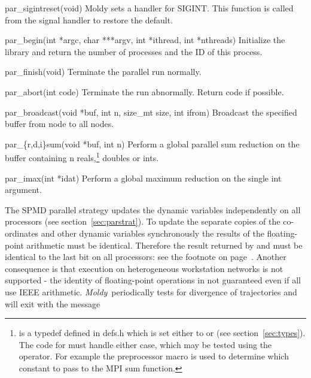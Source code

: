 \documentclass[a4paper,twoside]{report}
\newcommand{\Fname}[1]{{\upshape\mdseries\sffamily#1}}
\newenvironment{Litdescription}{\begingroup%
     \renewcommand{\descriptionlabel}[1]{\Lit{##1}}\begin{description}}%
     {\end{description}\endgroup}
\newcommand{\moldy}{\emph{Moldy}}
\begin{document}
\begin{Litdescription}
\sloppy
\item[par\_sigintreset(void)] Moldy sets a handler for SIGINT\@.  This
  function is called from the signal handler to restore the default.
\item[par\_begin(int *argc, char ***argv, int *ithread, int
  *nthreads)] Initialize the library and return the number of
  processes and the ID of this process.
\item[par\_finish(void)] Terminate the parallel run normally.
\item[par\_abort(int code)] Terminate the run abnormally.  Return code
  if possible.
\item[par\_broadcast(void *buf, int n, size\_mt size, int ifrom)]
  Broadcast the specified buffer from node  to all nodes.
\item[par\_\{r,d,i\}sum(void *buf, int n)] Perform a global parallel
  sum reduction on the buffer containing n reals,\footnote{
    is a typedef defined in \Fname{defs.h} which is set either to
     or  (see section~\ref{sec:types}).  The
    code for  must handle either case, which may be
    tested using the  operator. For example the
    preprocessor macro  is used
    to determine which constant to pass to the MPI sum function.}
  doubles or ints. 
\item[par\_imax(int *idat)] Perform a global maximum reduction on
  the single int argument.
\fussy
\end{Litdescription}

The SPMD parallel strategy updates the dynamic variables independently on
all processors (see section~\ref{sec:parstrat}).  To update the
separate copies of the co-ordinates and other dynamic variables
synchronously the results of the floating-point arithmetic must be
identical.  Therefore the result returned by  and
 must be identical to the last bit on all processors:
see the footnote on page~\pageref{sec:parstrat}.  Another consequence
is that execution on heterogeneous workstation networks is not
supported - the identity of floating-point operations in not
guaranteed even if all use IEEE arithmetic.  \moldy\ periodically
tests for divergence of trajectories and will exit with the message

\end{document}
